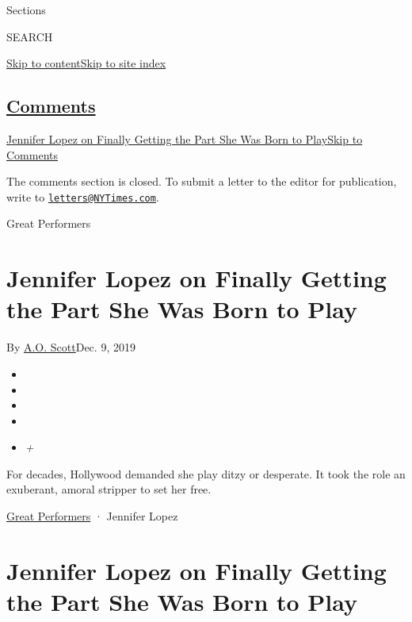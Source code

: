 Sections

SEARCH

\protect\hyperlink{site-content}{Skip to
content}\protect\hyperlink{site-index}{Skip to site index}

\hypertarget{comments}{%
\subsection{\texorpdfstring{\protect\hyperlink{commentsContainer}{Comments}}{Comments}}\label{comments}}

\href{}{Jennifer Lopez on Finally Getting the Part She Was Born to
Play}\href{}{Skip to Comments}

The comments section is closed. To submit a letter to the editor for
publication, write to
\href{mailto:letters@NYTimes.com}{\nolinkurl{letters@NYTimes.com}}.

Great Performers

\hypertarget{jennifer-lopez-on-finally-getting-the-part-she-was-born-to-play}{%
\section{Jennifer Lopez on Finally Getting the Part She Was Born to
Play}\label{jennifer-lopez-on-finally-getting-the-part-she-was-born-to-play}}

By \href{https://www.nytimes3xbfgragh.onion/by/a-o--scott}{A.O.
Scott}Dec. 9, 2019

\begin{itemize}
\item
\item
\item
\item
\item
  \emph{+}
\end{itemize}

For decades, Hollywood demanded she play ditzy or desperate. It took the
role an exuberant, amoral stripper to set her free.

\href{https://www.nytimes3xbfgragh.onion/interactive/2019/12/09/magazine/best-actors.html}{Great
Performers} · Jennifer Lopez

\hypertarget{jennifer-lopez-on-finally-getting-the-part-she-was-born-to-play-1}{%
\section{Jennifer Lopez on Finally Getting the Part She Was Born to
Play}\label{jennifer-lopez-on-finally-getting-the-part-she-was-born-to-play-1}}

